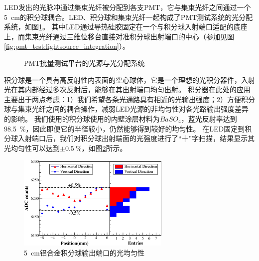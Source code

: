 LED发出的光脉冲通过集束光纤被分配到各支PMT，它与集束光纤之间通过一个\SI{5}{\centi\meter}的积分球耦合。LED、积分球和集束光纤一起构成了PMT测试系统的光分配系统，如图\ref{fig:pmt_test:light_distribution}。
其中LED通过导热硅胶固定在一个与积分球入射端口适配的底座上，而集束光纤通过三维位移台直接对准积分球出射端口的中心（参加见图\ref{fig:pmt_test:lightsource_integration}）。
\begin{figure}[htbp]
	\centering
	\caption{PMT批量测试平台的光源与光分配系统}
	\label{fig:pmt_test:light_distribution}
\end{figure}
积分球是一个具有高反射性内表面的空心球体，它是一个理想的光积分器件，入射光在其内部经过多次反射后，能够在其出射端口均匀出射。
积分器在此处的应用主要出于两点考虑：1）我们希望各条光通路具有相近的光输出强度；2）方便积分球与集束光纤之间的耦合操作，减弱LED光源的非均匀性对各光路输出强度差异的影响。
我们使用的积分球\cite{integrating_sphere}使用的内壁涂层材料为$BaSO_4$，蓝光反射率达到\SI{98.5}{\percent}，因此即便它的半径较小，仍然能够得到较好的均匀性。
在LED固定到积分球入射端口后，我们对积分球出射端面的光强度进行了“十”字扫描，结果显示其光均匀性可以达到$\pm\SI{0.5}{\percent}$，如图\ref{fig:pmt_test:integrationsphere_uniformity}所示。
\begin{figure}[htbp]
	\centering
	\includegraphics[width=0.65\textwidth]{chap/pmt_test/fig/integrationsphere_uniformity.eps}
	\caption{\SI{5}{cm}铝合金积分球输出端口的光均匀性}
	\label{fig:pmt_test:integrationsphere_uniformity}
\end{figure}

